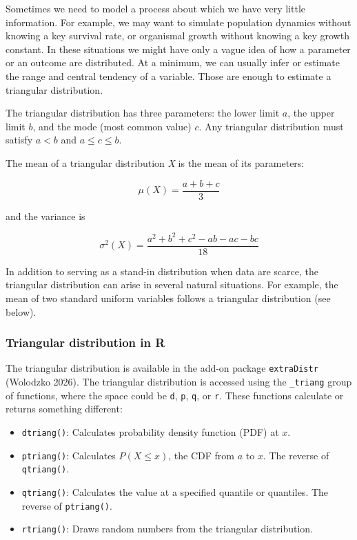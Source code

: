 \documentclass[
  13,
  letterpaper,
]{report}
\providecommand{\tightlist}{%
  \setlength{\itemsep}{0pt}\setlength{\parskip}{0pt}}
\begin{document}
Sometimes we need to model a process about which we have very little
information. For example, we may want to simulate population dynamics
without knowing a key survival rate, or organismal growth without
knowing a key growth constant. In these situations we might have only a
vague idea of how a parameter or an outcome are distributed. At a
minimum, we can usually infer or estimate the range and central tendency
of a variable. Those are enough to estimate a triangular distribution.

The triangular distribution has three parameters: the lower limit \(a\),
the upper limit \(b\), and the mode (most common value) \(c\). Any
triangular distribution must satisfy \(a<b\) and \(a\le{c}\le{b}\).

The mean of a triangular distribution \emph{X} is the mean of its
parameters:

\[\mu\left(X\right)=\frac{a+b+c}{3}\]

and the variance is

\[\sigma^2\left(X\right)=\frac{a^2+b^2+c^2-ab-ac-bc}{18}\]

In addition to serving as a stand-in distribution when data are scarce,
the triangular distribution can arise in several natural situations. For
example, the mean of two standard uniform variables follows a triangular
distribution (see below).

\subsubsection{Triangular distribution in R}\label{sec-dist-tri-r}

The triangular distribution is available in the add-on package
\texttt{extraDistr} (Wolodzko 2026). The triangular distribution is
accessed using the \texttt{\_triang} group of functions, where the space
could be \texttt{d}, \texttt{p}, \texttt{q}, or \texttt{r}. These
functions calculate or returns something different:

\begin{itemize}
\tightlist
\item
  \texttt{dtriang()}: Calculates probability density function (PDF) at
  \(x\).
\item
  \texttt{ptriang()}: Calculates \(P\left(X\le{x}\right)\), the CDF from
  \(a\) to \(x\). The reverse of \texttt{qtriang()}.
\item
  \texttt{qtriang()}: Calculates the value at a specified quantile or
  quantiles. The reverse of \texttt{ptriang()}.
\item
  \texttt{rtriang()}: Draws random numbers from the triangular
  distribution.
\end{itemize}
\end{document}
